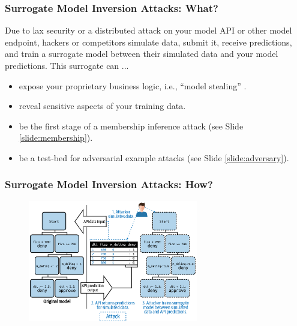 \documentclass[11pt,
               aspectratio=169,
               hyperref={colorlinks}
               ]{beamer}
\begin{document}
			\begin{frame}
		
				\frametitle{Surrogate Model Inversion Attacks: \textbf{What?}}
				
Due to lax security or a distributed attack on your model API or other model endpoint, hackers or competitors simulate data, submit it, receive predictions, and train a surrogate model between their simulated data and your model predictions. This surrogate can ...
				\begin{itemize}
				\item expose your proprietary business logic, i.e., ``model stealing'' \cite{model_stealing}. 
				\item reveal sensitive aspects of your training data. 
				\item be the first stage of a membership inference attack (see Slide \ref{slide:membership}).
				\item be a test-bed for adversarial example attacks (see Slide \ref{slide:adversary}). 
				\end{itemize}

			\end{frame}
		
			\begin{frame}[label={slide:inversion}]
		
				\frametitle{Surrogate Model Inversion Attacks: \textbf{How?}}	
			
				\begin{figure}[htb]
					\begin{center}
						\includegraphics[height=150pt]{../img/inversion.png}
					\end{center}
				\end{figure}	


			\end{frame}
		
\end{document}
